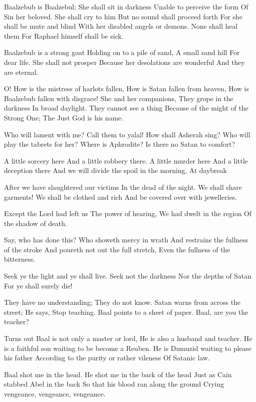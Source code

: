 \documentclass[
]{book}
\begin{document}
Baalzebub is Baalzebul;
She shall sit in darkness
Unable to perceive the form
Of Sin her beloved.
She shall cry to him
But no sound shall proceed forth
For she shall be mute and blind
With her disabled angels or demons.
None shall heal them
For Raphael himself shall be sick.

Baalzebub is a strong goat
Holding on to a pile of sand,
A small sand hill
For dear life.
She shall not prosper
Because her desolations are wonderful
And they are eternal.

O! How is the mistress of harlots fallen,
How is Satan fallen from heaven,
How is Baalzebub fallen with disgrace!
She and her companions,
They grope in the darkness
In broad daylight.
They cannot see a thing
Because of the might of the Strong One;
The Just God is his name.

Who will lament with me?
Call them to yalal!
How shall Asherah sing?
Who will play the tabrets for her?
Where is Aphrodite?
Is there no Satan to comfort?

A little sorcery here
And a little robbery there.
A little murder here
And a little deception there
And we will divide the spoil in the morning,
At daybreak

After we have slaughtered our victims
In the dead of the night.
We shall share garments!
We shall be clothed and rich
And be covered over with jewelleries.

Except the Lord had left us
The power of hearing,
We had dwelt in the region
Of the shadow of death.

Say, who has done this?
Who showeth mercy in wrath
And restrains the fullness of the stroke
And poureth not out the full stretch,
Even the fullness of the bitterness.

Seek ye the light and ye shall live.
Seek not the darkness
Nor the depths of Satan
For ye shall surely die!

They have no understanding;
They do not know.
Satan warns from across the street;
He says, Stop teaching.
Baal points to a sheet of paper.
Baal, are you the teacher?

Turns out Baal is not only a master or lord,
He is also a husband and teacher.
He is a faithful son waiting to be become a Reuben.
He is Dumuzid waiting to please his father
According to the purity or rather vileness
Of Satanic law.

Baal shot me in the head.
He shot me in the back of the head
Just as Cain stabbed Abel in the back
So that his blood ran along the ground
Crying vengeance, vengeance, vengeance.
\end{document}
